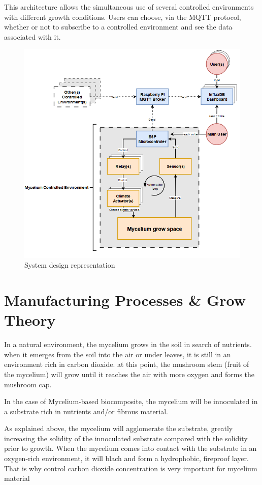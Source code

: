 This architecture allows the simultaneous use of several controlled environments with different growth conditions. Users can choose, via the MQTT protocol, whether or not to subscribe to a controlled environment and see the data associated with it. 

\begin{figure}[h]
    \centering
    \includegraphics[width=1.4\textwidth]{images/diagMyceliummachine2.png}
    \caption{System design representation}
    \label{fig:blasttrash}
\end{figure} 


\section{Manufacturing Processes \& Grow Theory}

In a natural environment, the mycelium grows in the soil in search of nutrients. when it emerges from the soil into the air or under leaves, it is still in an environment rich in carbon dioxide. at this point, the mushroom stem (fruit of the mycelium) will grow until it reaches the air with more oxygen and forms the mushroom cap. 

In the case of Mycelium-based biocomposite, the mycelium will be innoculated in a substrate rich in nutrients and/or fibrous material. 

As explained above, the mycelium will agglomerate the substrate, greatly increasing the solidity of the innoculated substrate compared with the solidity prior to growth. 
When the mycelium comes into contact with the substrate in an oxygen-rich environment, it will blach and form a hydrophobic, fireproof layer.
That is why control carbon dioxide concentration is very important for mycelium material


